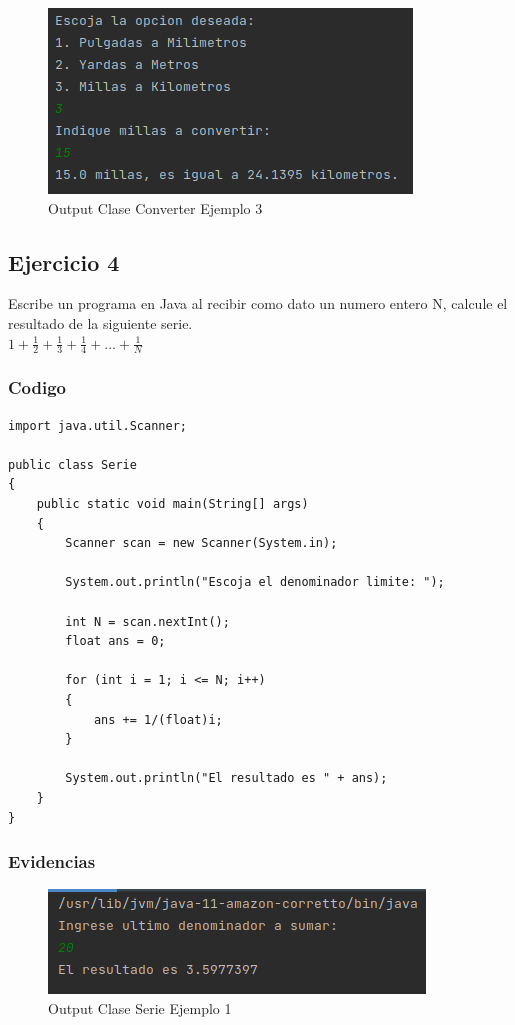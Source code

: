 \documentclass{article}
\begin{document}
\begin{figure}[h]
	\centering
	\includegraphics[scale = 1]{images/converter3.png}
	\caption{Output Clase Converter Ejemplo 3}
\end{figure}
\newpage

\subsection{Ejercicio 4}

Escribe un programa en Java al recibir como dato un numero entero N, calcule el resultado de la siguiente serie.\\

$1 + \frac{1}{2} + \frac{1}{3} + \frac{1}{4} + ... + \frac{1}{N}$\\

\subsubsection{Codigo}

\begin{lstlisting}
import java.util.Scanner;

public class Serie
{
	public static void main(String[] args)
	{
		Scanner scan = new Scanner(System.in);
		
		System.out.println("Escoja el denominador limite: ");
		
		int N = scan.nextInt();
		float ans = 0;
		
		for (int i = 1; i <= N; i++)
		{
			ans += 1/(float)i;
		}
		
		System.out.println("El resultado es " + ans);
	}
}
\end{lstlisting}
\newpage

\subsubsection{Evidencias}
\begin{figure}[h]
	\centering
	\includegraphics[scale = 1]{images/serie1.png}
	\caption{Output Clase Serie Ejemplo 1}
\end{figure}
\end{document}
